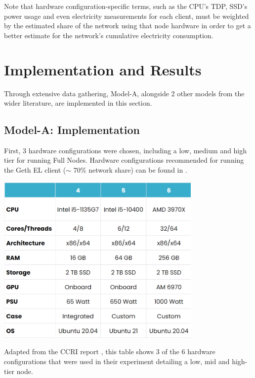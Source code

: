 Note that hardware configuration-specific terms, such as the CPU's TDP, SSD's power usage and even electricity measurements for each client, must be weighted by the estimated share of the network using that node hardware in order to get a better estimate for the network's cumulative electricity consumption. 


\section{Implementation and Results}
\label{ImplementationSection}
Through extensive data gathering, Model-A, alongside 2 other models from the wider literature, are implemented in this section.


\subsection{Model-A: Implementation}

First, 3 hardware configurations were chosen, including a low, medium and high tier for running Full Nodes. Hardware configurations recommended for running the Geth EL client ($\sim$ 70\% network share) can be found in .

\begin{table}[htb!]
    \centering
    \includegraphics[width=10cm,center]{Figures/CCRIhardwareConfigEdit.png}
    \caption{Adapted from the CCRI report \cite{CryptoCarbonRatingsInstitute2022TheNetwork}, this table shows 3 of the 6 hardware configurations that were used in their experiment detailing a low, mid and high-tier node.}
    \label{Table:CCRIhardwareConfig}
\end{table}


